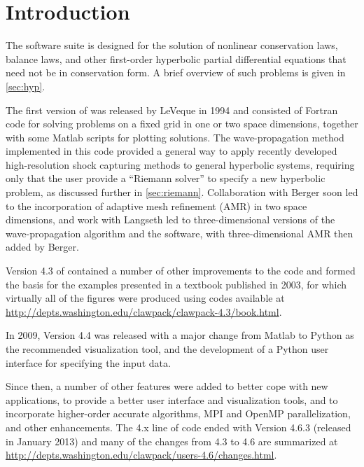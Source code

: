 %
%
%

\section{Introduction}\label{sec:intro}

The \clawpack software suite \cite{clawpack}
is designed for the solution of nonlinear conservation laws, balance laws,
and other first-order hyperbolic partial differential
equations that need not be in conservation form. 
A brief overview of such problems is given in \cref{sec:hyp}.

The first version of \clawpack was released by LeVeque in 1994 
\cite{clawpack-v1} and consisted of Fortran code for solving problems on a
fixed grid in one or two space dimensions, together with some Matlab scripts
for plotting solutions. The wave-propagation method implemented
in this code provided a general way to apply recently developed
high-resolution shock capturing methods to general hyperbolic systems,
requiring only that the user provide a ``Riemann solver'' to specify a new
hyperbolic problem, as discussed further in \cref{sec:riemann}.  
Collaboration with Berger \cite{mjb-rjl:amrclaw} 
soon led to the incorporation of adaptive mesh refinement (AMR) in two space
dimensions, and work with Langseth \cite{jol-rjl:3d, jol:thesis}
led to three-dimensional versions of the wave-propagation algorithm and the
software, with three-dimensional AMR then added by Berger.

Version 4.3 of \clawpack contained a number of other improvements to the code
and formed the basis for the examples presented in a textbook \cite{rjl:fvmhp}
published in 2003, for which virtually all of the figures were
produced using codes available at
\url{http://depts.washington.edu/clawpack/clawpack-4.3/book.html}.

In 2009, Version 4.4 was released with a major change from Matlab
to Python as the recommended visualization tool, and the development
of a Python user interface for specifying the input data.

Since then, a number of other features were added to better cope with new
applications, to provide a better user interface and visualization tools, and to
incorporate higher-order accurate algorithms, MPI and OpenMP parallelization, and
other enhancements. The \clawpack 4.x line of code ended with Version 4.6.3
(released in January 2013) and
many of the changes from 4.3 to 4.6 are summarized at
\url{http://depts.washington.edu/clawpack/users-4.6/changes.html}.

